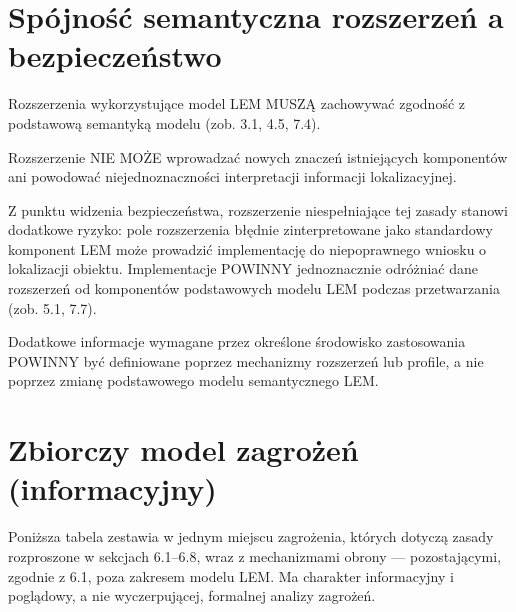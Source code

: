 \section{Spójność semantyczna rozszerzeń a bezpieczeństwo}
Rozszerzenia wykorzystujące model LEM MUSZĄ zachowywać zgodność z podstawową semantyką modelu (zob. 3.1, 4.5, 7.4).

Rozszerzenie NIE MOŻE wprowadzać nowych znaczeń istniejących komponentów ani powodować niejednoznaczności interpretacji informacji lokalizacyjnej.

Z punktu widzenia bezpieczeństwa, rozszerzenie niespełniające tej zasady stanowi dodatkowe ryzyko: pole rozszerzenia błędnie zinterpretowane jako standardowy komponent LEM może prowadzić implementację do niepoprawnego wniosku o lokalizacji obiektu. Implementacje POWINNY jednoznacznie odróżniać dane rozszerzeń od komponentów podstawowych modelu LEM podczas przetwarzania (zob. 5.1, 7.7).

Dodatkowe informacje wymagane przez określone środowisko zastosowania POWINNY być definiowane poprzez mechanizmy rozszerzeń lub profile, a nie poprzez zmianę podstawowego modelu semantycznego LEM.

\section{Zbiorczy model zagrożeń (informacyjny)}
Poniższa tabela zestawia w jednym miejscu zagrożenia, których dotyczą zasady rozproszone w sekcjach 6.1–6.8, wraz z mechanizmami obrony — pozostającymi, zgodnie z 6.1, poza zakresem modelu LEM. Ma charakter informacyjny i poglądowy, a nie wyczerpującej, formalnej analizy zagrożeń.


